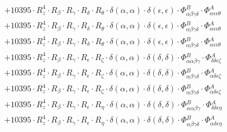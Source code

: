 \documentclass{article}
\begin{document}
\begin{subequations}
\begin{gather}
\begin{array}{c}
 \\[0.2em] 		 + 10395 \cdot R_{z}^{4} \cdot R_{\beta{}} \cdot R_{\gamma{}} \cdot R_{\delta{}} \cdot R_{\theta{}} \cdot \delta{}\left(\alpha{}, \alpha{}\right) \cdot \delta{}\left(\epsilon{}, \epsilon{}\right) \cdot \Phi{}^{B}_{\alpha{}\beta{}\gamma{}\delta{}} \cdot \Phi{}^{A}_{\alpha{}\epsilon{}\epsilon{}\theta{}} 
 \\[0.2em] 		 + 10395 \cdot R_{z}^{4} \cdot R_{\beta{}} \cdot R_{\gamma{}} \cdot R_{\delta{}} \cdot R_{\theta{}} \cdot \delta{}\left(\alpha{}, \alpha{}\right) \cdot \delta{}\left(\epsilon{}, \epsilon{}\right) \cdot \Phi{}^{B}_{\alpha{}\beta{}\gamma{}\delta{}} \cdot \Phi{}^{A}_{\alpha{}\epsilon{}\epsilon{}\theta{}} 
 \\[0.2em] 		 + 10395 \cdot R_{z}^{4} \cdot R_{\beta{}} \cdot R_{\gamma{}} \cdot R_{\delta{}} \cdot R_{\theta{}} \cdot \delta{}\left(\alpha{}, \alpha{}\right) \cdot \delta{}\left(\epsilon{}, \epsilon{}\right) \cdot \Phi{}^{B}_{\alpha{}\beta{}\gamma{}\delta{}} \cdot \Phi{}^{A}_{\alpha{}\epsilon{}\epsilon{}\theta{}} 
 \\[0.2em] 		 + 10395 \cdot R_{z}^{4} \cdot R_{\beta{}} \cdot R_{\gamma{}} \cdot R_{\epsilon{}} \cdot R_{\zeta{}} \cdot \delta{}\left(\alpha{}, \alpha{}\right) \cdot \delta{}\left(\delta{}, \delta{}\right) \cdot \Phi{}^{B}_{\alpha{}\alpha{}\beta{}\gamma{}} \cdot \Phi{}^{A}_{\delta{}\delta{}\epsilon{}\zeta{}} 
 \\[0.2em] 		 + 10395 \cdot R_{z}^{4} \cdot R_{\beta{}} \cdot R_{\gamma{}} \cdot R_{\epsilon{}} \cdot R_{\zeta{}} \cdot \delta{}\left(\alpha{}, \alpha{}\right) \cdot \delta{}\left(\delta{}, \delta{}\right) \cdot \Phi{}^{B}_{\alpha{}\beta{}\gamma{}\delta{}} \cdot \Phi{}^{A}_{\alpha{}\delta{}\epsilon{}\zeta{}} 
 \\[0.2em] 		 + 10395 \cdot R_{z}^{4} \cdot R_{\beta{}} \cdot R_{\gamma{}} \cdot R_{\epsilon{}} \cdot R_{\zeta{}} \cdot \delta{}\left(\alpha{}, \alpha{}\right) \cdot \delta{}\left(\delta{}, \delta{}\right) \cdot \Phi{}^{B}_{\alpha{}\beta{}\gamma{}\delta{}} \cdot \Phi{}^{A}_{\alpha{}\delta{}\epsilon{}\zeta{}} 
 \\[0.2em] 		 + 10395 \cdot R_{z}^{4} \cdot R_{\beta{}} \cdot R_{\gamma{}} \cdot R_{\epsilon{}} \cdot R_{\eta{}} \cdot \delta{}\left(\alpha{}, \alpha{}\right) \cdot \delta{}\left(\delta{}, \delta{}\right) \cdot \Phi{}^{B}_{\alpha{}\alpha{}\beta{}\gamma{}} \cdot \Phi{}^{A}_{\delta{}\delta{}\epsilon{}\eta{}} 
 \\[0.2em] 		 + 10395 \cdot R_{z}^{4} \cdot R_{\beta{}} \cdot R_{\gamma{}} \cdot R_{\epsilon{}} \cdot R_{\eta{}} \cdot \delta{}\left(\alpha{}, \alpha{}\right) \cdot \delta{}\left(\delta{}, \delta{}\right) \cdot \Phi{}^{B}_{\alpha{}\beta{}\gamma{}\delta{}} \cdot \Phi{}^{A}_{\alpha{}\delta{}\epsilon{}\eta{}} 

\end{array}
\end{gather}
\end{subequations}
\end{document}
